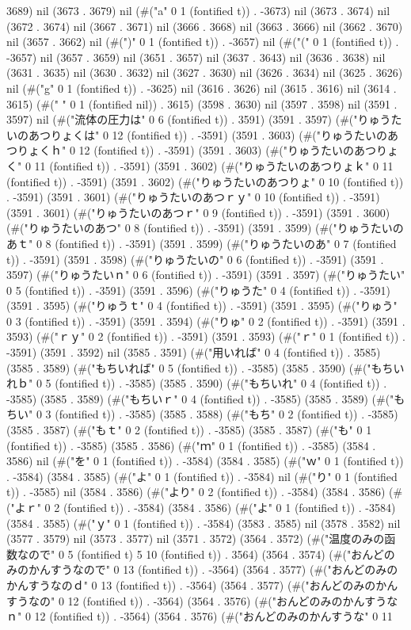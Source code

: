 3689) nil (3673 . 3679) nil (#("a" 0 1 (fontified t)) . -3673) nil (3673 . 3674) nil (3672 . 3674) nil (3667 . 3671) nil (3666 . 3668) nil (3663 . 3666) nil (3662 . 3670) nil (3657 . 3662) nil (#(")" 0 1 (fontified t)) . -3657) nil (#("(" 0 1 (fontified t)) . -3657) nil (3657 . 3659) nil (3651 . 3657) nil (3637 . 3643) nil (3636 . 3638) nil (3631 . 3635) nil (3630 . 3632) nil (3627 . 3630) nil (3626 . 3634) nil (3625 . 3626) nil (#("g" 0 1 (fontified t)) . -3625) nil (3616 . 3626) nil (3615 . 3616) nil (3614 . 3615) (#(" " 0 1 (fontified nil)) . 3615) (3598 . 3630) nil (3597 . 3598) nil (3591 . 3597) nil (#("流体の圧力は" 0 6 (fontified t)) . 3591) (3591 . 3597) (#("りゅうたいのあつりょくは" 0 12 (fontified t)) . -3591) (3591 . 3603) (#("りゅうたいのあつりょくｈ" 0 12 (fontified t)) . -3591) (3591 . 3603) (#("りゅうたいのあつりょく" 0 11 (fontified t)) . -3591) (3591 . 3602) (#("りゅうたいのあつりょｋ" 0 11 (fontified t)) . -3591) (3591 . 3602) (#("りゅうたいのあつりょ" 0 10 (fontified t)) . -3591) (3591 . 3601) (#("りゅうたいのあつｒｙ" 0 10 (fontified t)) . -3591) (3591 . 3601) (#("りゅうたいのあつｒ" 0 9 (fontified t)) . -3591) (3591 . 3600) (#("りゅうたいのあつ" 0 8 (fontified t)) . -3591) (3591 . 3599) (#("りゅうたいのあｔ" 0 8 (fontified t)) . -3591) (3591 . 3599) (#("りゅうたいのあ" 0 7 (fontified t)) . -3591) (3591 . 3598) (#("りゅうたいの" 0 6 (fontified t)) . -3591) (3591 . 3597) (#("りゅうたいｎ" 0 6 (fontified t)) . -3591) (3591 . 3597) (#("りゅうたい" 0 5 (fontified t)) . -3591) (3591 . 3596) (#("りゅうた" 0 4 (fontified t)) . -3591) (3591 . 3595) (#("りゅうｔ" 0 4 (fontified t)) . -3591) (3591 . 3595) (#("りゅう" 0 3 (fontified t)) . -3591) (3591 . 3594) (#("りゅ" 0 2 (fontified t)) . -3591) (3591 . 3593) (#("ｒｙ" 0 2 (fontified t)) . -3591) (3591 . 3593) (#("ｒ" 0 1 (fontified t)) . -3591) (3591 . 3592) nil (3585 . 3591) (#("用いれば" 0 4 (fontified t)) . 3585) (3585 . 3589) (#("もちいれば" 0 5 (fontified t)) . -3585) (3585 . 3590) (#("もちいれｂ" 0 5 (fontified t)) . -3585) (3585 . 3590) (#("もちいれ" 0 4 (fontified t)) . -3585) (3585 . 3589) (#("もちいｒ" 0 4 (fontified t)) . -3585) (3585 . 3589) (#("もちい" 0 3 (fontified t)) . -3585) (3585 . 3588) (#("もち" 0 2 (fontified t)) . -3585) (3585 . 3587) (#("もｔ" 0 2 (fontified t)) . -3585) (3585 . 3587) (#("も" 0 1 (fontified t)) . -3585) (3585 . 3586) (#("ｍ" 0 1 (fontified t)) . -3585) (3584 . 3586) nil (#("を" 0 1 (fontified t)) . -3584) (3584 . 3585) (#("ｗ" 0 1 (fontified t)) . -3584) (3584 . 3585) (#("よ" 0 1 (fontified t)) . -3584) nil (#("り" 0 1 (fontified t)) . -3585) nil (3584 . 3586) (#("より" 0 2 (fontified t)) . -3584) (3584 . 3586) (#("よｒ" 0 2 (fontified t)) . -3584) (3584 . 3586) (#("よ" 0 1 (fontified t)) . -3584) (3584 . 3585) (#("ｙ" 0 1 (fontified t)) . -3584) (3583 . 3585) nil (3578 . 3582) nil (3577 . 3579) nil (3573 . 3577) nil (3571 . 3572) (3564 . 3572) (#("温度のみの函数なので" 0 5 (fontified t) 5 10 (fontified t)) . 3564) (3564 . 3574) (#("おんどのみのかんすうなので" 0 13 (fontified t)) . -3564) (3564 . 3577) (#("おんどのみのかんすうなのｄ" 0 13 (fontified t)) . -3564) (3564 . 3577) (#("おんどのみのかんすうなの" 0 12 (fontified t)) . -3564) (3564 . 3576) (#("おんどのみのかんすうなｎ" 0 12 (fontified t)) . -3564) (3564 . 3576) (#("おんどのみのかんすうな" 0 11 